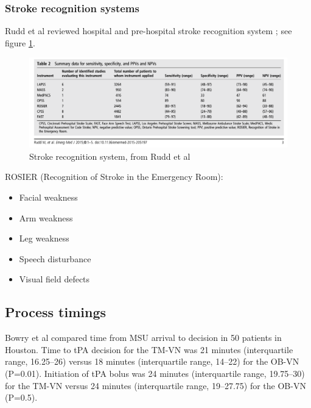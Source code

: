 \subsubsection{Stroke recognition systems}

Rudd et al reviewed hospital and pre-hospital stroke recognition system \cite{rudd_systematic_2016}; see figure \ref{fig:rudd}.

\begin{figure}
    \centering
    \includegraphics[width=0.9\linewidth]{images_background/rudd.png}
    \caption{Stroke recognition system, from Rudd et al}
    \label{fig:rudd}
\end{figure}

ROSIER (Recognition of Stroke in the Emergency Room):

\begin{itemize}
    \item Facial weakness
    \item Arm weakness
    \item Leg weakness
    \item Speech disturbance
    \item Visual field defects
\end{itemize}








\subsection{Process timings}

Bowry et al \cite{bowry_time_2018} compared time from MSU arrival to decision in 50 patients in Houston. Time to tPA decision for the TM-VN was 21 minutes (interquartile range, 16.25–26) versus 18 minutes (interquartile range, 14–22) for the OB-VN (P=0.01). Initiation of tPA bolus was 24 minutes (interquartile range, 19.75–30) for the TM-VN versus 24 minutes (interquartile range, 19–27.75) for the OB-VN (P=0.5).


